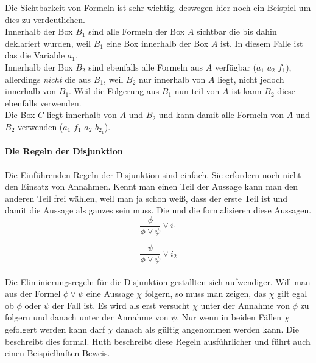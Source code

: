 Die Sichtbarkeit von Formeln ist sehr wichtig, deswegen hier noch ein Beispiel um dies zu verdeutlichen.\\
Innerhalb der Box $B_1$ sind alle Formeln der Box $A$ sichtbar die bis dahin deklariert wurden, weil $B_1$ eine Box innerhalb der Box $A$ ist. In diesem Falle ist das die Variable $a_1$.\\
Innerhalb der Box $B_2$ sind ebenfalls alle Formeln aus $A$ verfügbar ($a_1$ $a_2$ $f_1$), allerdings \emph{nicht} die aus $B_1$, weil $B_2$ nur innerhalb von $A$ liegt, nicht jedoch innerhalb von $B_1$.
Weil die Folgerung aus $B_1$ nun teil von $A$ ist kann $B_2$ diese ebenfalls verwenden.\\
Die Box $C$ liegt innerhalb von $A$ und $B_2$ und kann damit alle Formeln von $A$ und $B_2$ verwenden ($a_1$ $f_1$ $a_2$ $b_{2_1}$).\\


\paragraph{Die Regeln der Disjunktion}

Die Einführenden Regeln der Disjunktion sind einfach.
Sie erfordern noch nicht den Einsatz von Annahmen.
Kennt man einen Teil der Aussage kann man den anderen Teil frei wählen, weil man ja schon weiß, dass der erste Teil \true ist und damit die Aussage als ganzes \true sein muss.
Die  und die  formalisieren diese Aussagen.\\

\begin{equation}
	\label{eq:i1Disjunction}
	\frac{\phi}{\phi \vee \psi} \vee i_1
\end{equation}

\begin{equation}
	\label{eq:i2Disjunction}
	\frac{\psi}{\phi \vee \psi} \vee i_2
\end{equation}
\\
Die Eliminierungsregeln für die Disjunktion gestallten sich aufwendiger.
Will man aus der Formel $\phi \vee \psi$ eine Aussage $\chi$ folgern, so muss man zeigen, das $\chi$ gilt egal ob $\phi$ oder $\psi$ der Fall ist. 
Es wird als erst versucht $\chi$ unter der Annahme von  $\phi$ zu folgern und danach unter der Annahme von $\psi$.
Nur wenn in beiden Fällen $\chi$ gefolgert werden kann darf $\chi$ danach als gültig angenommen werden kann.
Die  beschreibt dies formal. 
Huth \cite[S.16ff]{huth2004logic} beschreibt diese Regeln ausführlicher und führt auch einen Beispielhaften Beweis.

